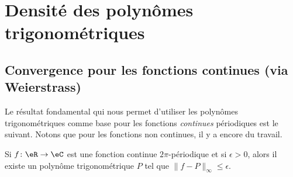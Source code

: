 
\section{Densité des polynômes trigonométriques}

\subsection{Convergence pour les fonctions continues (via Weierstrass)}

Le résultat fondamental qui nous permet d'utiliser les polynômes trigonométriques comme base pour les fonctions \emph{continues} périodiques est le suivant. Notons que pour les fonctions non continues, il y a encore du travail.
\begin{lemma}   \label{LemXGYaRlC}
	Si \( f\colon \eR\to \eC\) est une fonction continue \( 2\pi\)-périodique et si \( \epsilon>0\), alors il existe un polynôme trigonométrique \( P\) tel que \( \| f-P \|_{\infty}\leq \epsilon\).
\end{lemma}

